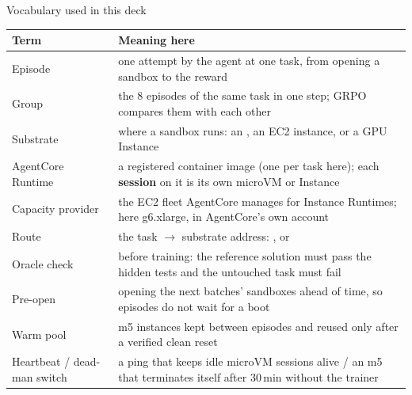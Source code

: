 \begin{frame}{Vocabulary used in this deck}
\scriptsize\setlength{\tabcolsep}{4pt}
\begin{tabularx}{\textwidth}{@{}P{0.20\textwidth}Y@{}}
\toprule
\textbf{Term} & \textbf{Meaning here}\\
\midrule
Episode & one attempt by the agent at one task, from opening a sandbox to the reward\\
Group & the 8 episodes of the same task in one step; GRPO compares them with each other\\
Substrate & where a sandbox runs: an \smv{}, an \sm{} EC2 instance, or a \sg{} GPU Instance\\
AgentCore Runtime & a registered container image (one per task here); each \textbf{session} on it is its own microVM or Instance\\
Capacity provider & the EC2 fleet AgentCore manages for Instance Runtimes; here g6.xlarge, in AgentCore's own account\\
Route & the task $\rightarrow$ substrate address: ,  or \\
Oracle check & before training: the reference solution must pass the hidden tests and the untouched task must fail\\
Pre-open & opening the next batches' sandboxes ahead of time, so episodes do not wait for a boot\\
Warm pool & m5 instances kept between episodes and reused only after a verified clean reset\\
Heartbeat / dead-man switch & a ping that keeps idle microVM sessions alive / an m5 that terminates itself after 30\,min without the trainer\\
\bottomrule
\end{tabularx}
\end{frame}


